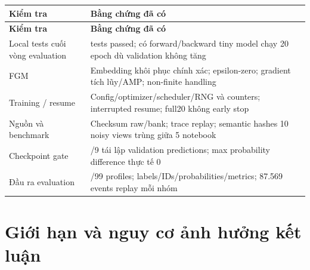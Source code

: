 \documentclass[11pt,a4paper]{article}
\newlength{\reporttablewidth}
\begin{document}
\begingroup
\small
\setlength{\tabcolsep}{4pt}
\setlength{\reporttablewidth}{\dimexpr\linewidth-2\tabcolsep\relax}
\renewcommand{\arraystretch}{1.15}
\begin{longtable}{@{}>{\raggedright\arraybackslash}p{0.31000\reporttablewidth}>{\raggedright\arraybackslash}p{0.69000\reporttablewidth}@{}}
\toprule
\textbf{Kiểm tra} & \textbf{Bằng chứng đã có} \\
\midrule
\endfirsthead
\toprule
\textbf{Kiểm tra} & \textbf{Bằng chứng đã có} \\
\midrule
\endhead
\bottomrule
\endlastfoot
Local tests cuối vòng evaluation & 36 tests passed; có forward/backward tiny model chạy 20 epoch dù validation không tăng \\
FGM & Embedding khôi phục chính xác; epsilon-zero; gradient tích lũy/AMP; non-finite handling \\
Training / resume & Config/optimizer/scheduler/RNG và counters; interrupted resume; full20 không early stop \\
Nguồn và benchmark & Checksum raw/bank; trace replay; semantic hashes 10 noisy views trùng giữa 5 notebook \\
Checkpoint gate & 9/9 tái lập validation predictions; max probability difference thực tế 0 \\
Đầu ra evaluation & 99/99 profiles; labels/IDs/probabilities/metrics; 87.569 events replay mỗi nhóm \\
\end{longtable}
\endgroup

\FloatBarrier\section{Giới hạn và nguy cơ ảnh hưởng kết luận}
\end{document}
